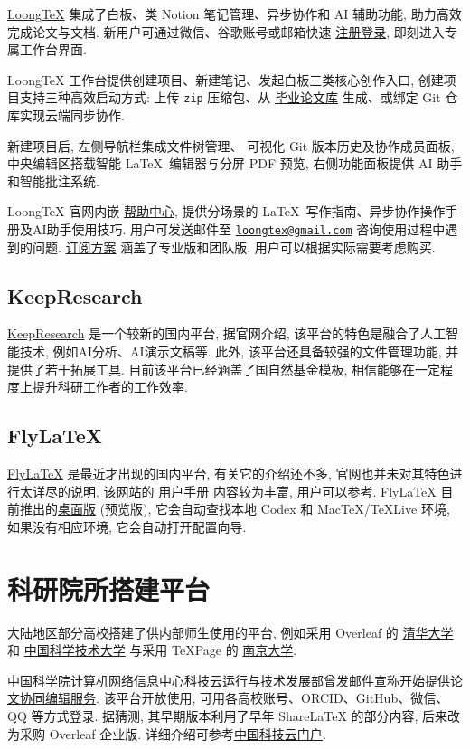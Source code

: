 \href{https://www.loongtex.com/}{LoongTeX}
集成了白板、类 Notion 笔记管理、异步协作和 AI 辅助功能, 助力高效完成论文与文档.
新用户可通过微信、谷歌账号或邮箱快速%
\href{https://app.loongtex.com/user/login}{注册登录},
即刻进入专属工作台界面.

LoongTeX 工作台提供创建项目、新建笔记、发起白板三类核心创作入口,
创建项目支持三种高效启动方式: 上传 \texttt{zip} 压缩包、从%
\href{https://www.loongtex.com/templates/}{毕业论文库}%
生成、或绑定 Git 仓库实现云端同步协作.

新建项目后, 左侧导航栏集成文件树管理、
可视化 Git 版本历史及协作成员面板,
中央编辑区搭载智能 \LaTeX\ 编辑器与分屏 PDF 预览,
右侧功能面板提供 AI 助手和智能批注系统.

LoongTeX 官网内嵌%
\href{https://www.loongtex.com/docs/app/help/}{帮助中心},
提供分场景的 \LaTeX\ 写作指南、异步协作操作手册及AI助手使用技巧.
用户可发送邮件至
\href{mailto:loongtex@gmail.com}{\texttt{loongtex@gmail.com}}
咨询使用过程中遇到的问题.
\href{https://www.loongtex.com/pricing}{订阅方案}%
涵盖了专业版和团队版,
用户可以根据实际需要考虑购买.

\subsection{KeepResearch}

\href{https://www.keepresearch.com/}{KeepResearch} 是一个较新的国内平台,
据官网介绍,
该平台的特色是融合了人工智能技术,
例如AI分析、AI演示文稿等.
此外,
该平台还具备较强的文件管理功能,
并提供了若干拓展工具.
目前该平台已经涵盖了国自然基金模板,
相信能够在一定程度上提升科研工作者的工作效率.

\subsection{FlyLaTeX}

\href{https://flylatex.cn/}{FlyLaTeX} 是最近才出现的国内平台,
有关它的介绍还不多,
官网也并未对其特色进行太详尽的说明.
该网站的%
\href{https://www.flylatex.cn/pdf-viewer.html?pdf=./Files/FlyLaTeX.pdf}{用户手册}%
内容较为丰富,
用户可以参考.
FlyLaTeX 目前推出的\href{http://bbs.inoteexpress.com/forum.php?mod=viewthread&tid=82182&extra=page%3D1}{桌面版} (预览版),
它会自动查找本地 Codex 和 Mac\TeX/\TeX Live 环境,
如果没有相应环境,
它会自动打开配置向导.

\section{科研院所搭建平台}

大陆地区部分高校搭建了供内部师生使用的平台,
例如采用 Overleaf 的%
\href{https://overleaf.tsinghua.edu.cn/login}{清华大学}%
和%
\href{https://latex.ustc.edu.cn/login}{中国科学技术大学}%
与采用 TeXPage 的%
\href{https://doc.nju.edu.cn/books/latex}{南京大学}.

中国科学院计算机网络信息中心科技云运行与技术发展部曾发邮件宣称开始提供\href{https://latex.cstcloud.cn}{论文协同编辑服务}.
该平台开放使用,
可用各高校账号、ORCID、GitHub、微信、QQ 等方式登录.
据猜测,
其早期版本利用了早年 ShareLaTeX 的部分内容,
后来改为采购 Overleaf 企业版.
详细介绍可参考\href{https://www.cstcloud.cn/resources/452}{中国科技云门户}.
